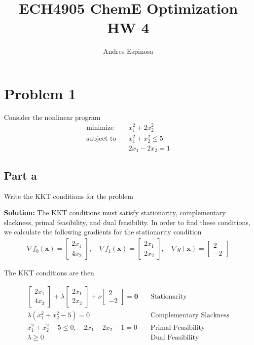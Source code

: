 \documentclass[11pt]{article}
\title{ECH4905 ChemE Optimization HW 4}
\author{Andres Espinosa}
\begin{document}
\maketitle

\section{Problem 1}
Consider the nonlinear program
\begin{align*}
  \text{minimize} & \quad x_1^2 + 2x_2^2 \\
  \text{subject to} & \quad x_1^2 + x_2^2 \leq 5 \\
  & \quad 2x_1 - 2x_2 = 1
\end{align*}

\subsection{Part a}
Write the KKT conditions for the problem
\label{p1:kkt}

\textbf{Solution: }
The KKT conditions must satisfy stationarity, complementary slackness, primal feasibility, and dual feasibility.
In order to find these conditions, we calculate the following gradients for the stationarity condition
\begin{align*}
  \nabla f_0(\textbf{x}) =
  \begin{bmatrix}
    2x_1 \\ 4x_2
  \end{bmatrix}
  , \quad
  \nabla f_1(\textbf{x}) = 
  \begin{bmatrix}
    2x_1 \\ 2x_2
  \end{bmatrix}
  , \quad
  \nabla g(\textbf{x}) = 
  \begin{bmatrix}
    2 \\ -2
  \end{bmatrix}
\end{align*}

The KKT conditions are then

\begin{align*}
  \begin{bmatrix}
    2x_1 \\ 4x_2
  \end{bmatrix}
  +
  \lambda
  \begin{bmatrix}
    2x_1 \\ 2x_2
  \end{bmatrix}
  +
  \nu
  \begin{bmatrix}
    2 \\ -2
  \end{bmatrix}
  = \textbf{0}
  & \quad \text{Stationarity} \\
  \lambda (x_1^2 + x_2^2 - 5) = 0 
  & \quad \text{Complementary Slackness} \\
  x_1^2 + x_2^2 - 5 \leq 0, \quad 2x_1 - 2x_2 - 1 = 0
  & \quad \text{Primal Feasibility} \\
  \lambda \geq 0 
  & \quad \text{Dual Feasibility}
\end{align*}
\end{document}
